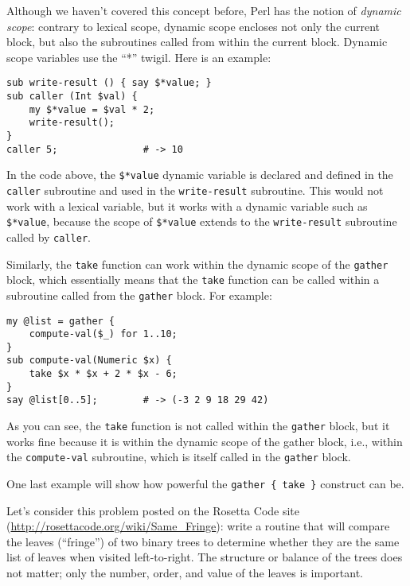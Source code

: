 Although we haven't covered this concept before, 
Perl has the notion of \emph{dynamic scope}: contrary 
to lexical scope, dynamic scope encloses not only 
the current block, but also the subroutines called 
from within the current block. Dynamic scope variables 
use the ``*'' twigil. Here is an example:
%
\begin{verbatim}
sub write-result () { say $*value; }
sub caller (Int $val) { 
    my $*value = $val * 2; 
    write-result();
}
caller 5;               # -> 10
\end{verbatim}
%
In the code above, the \verb'$*value' dynamic variable 
is declared and defined in the \verb'caller' subroutine 
and used in the \verb'write-result' subroutine. This would not 
work with a lexical variable, but it works with a dynamic 
variable such as \verb'$*value', because the scope of 
\verb'$*value' extends to the \verb'write-result' subroutine 
called by \verb'caller'. 

Similarly, the {\tt take} function 
can work within the dynamic scope of the \verb'gather' 
block, which essentially means that the {\tt take} 
function can be called within a subroutine called from 
the \verb'gather' block. For example:

\begin{verbatim}
my @list = gather {
    compute-val($_) for 1..10; 
}
sub compute-val(Numeric $x) {
    take $x * $x + 2 * $x - 6;
}
say @list[0..5];        # -> (-3 2 9 18 29 42)
\end{verbatim}

As you can see, the {\tt take} function is not called 
within the {\tt gather} block, but it works fine because 
it is within the dynamic scope of the gather block, i.e., 
within the {\tt compute-val} subroutine, which is itself 
called in the {\tt gather} block.

One last example will show how powerful the 
\verb'gather { take }' construct can be.

Let's consider this problem posted on the Rosetta Code 
site (\url{http://rosettacode.org/wiki/Same_Fringe}): 
write a routine that will compare the leaves (``fringe'') 
of two binary trees to determine whether they are the 
same list of leaves when visited left-to-right. The 
structure or balance of the trees does not matter; 
only the number, order, and value of the leaves is 
important. 

